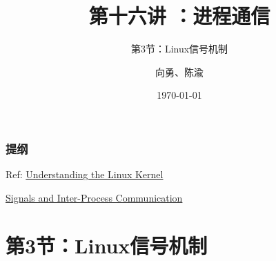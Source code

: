 


\title[第16讲]{第十六讲 ：进程通信} %
\subtitle{第3节：Linux信号机制}
\author{向勇、陈渝} %
\date{\today} %



\begin{frame}
\titlepage %
\end{frame}

\begin{frame}
\frametitle{提纲} %
\tableofcontents %

\pause

Ref: 
\href{http://ermak.cs.nstu.ru/understanding.linux.kernel.pdf }{Understanding the Linux Kernel}

\href{https://compas.cs.stonybrook.edu/~nhonarmand/courses/fa14/cse506.2/slides/ipc.pdf}{Signals and Inter-Process Communication}
\end{frame}
\section{第3节：Linux信号机制} %
